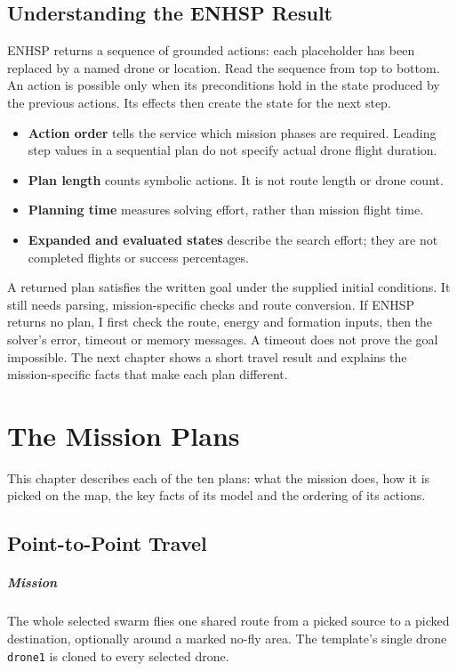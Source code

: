 \documentclass[11pt,a4paper,oneside]{report}
\newcommand{\code}[1]{\texttt{#1}}
\begin{document}
\section{Understanding the ENHSP Result}
ENHSP returns a sequence of grounded actions: each placeholder has been replaced
by a named drone or location. Read the sequence from top to bottom. An action
is possible only when its preconditions hold in the state produced by the
previous actions. Its effects then create the state for the next step.
\begin{itemize}
\item \textbf{Action order} tells the service which mission phases are required.
Leading step values in a sequential plan do not specify actual drone flight duration.
\item \textbf{Plan length} counts symbolic actions. It is not route length or drone count.
\item \textbf{Planning time} measures solving effort, rather than mission flight time.
\item \textbf{Expanded and evaluated states} describe the search effort; they are
not completed flights or success percentages.
\end{itemize}
A returned plan satisfies the written goal under the supplied initial conditions.
It still needs parsing, mission-specific checks and route conversion. If ENHSP
returns no plan, I first check the route, energy and formation inputs, then the
solver's error, timeout or memory messages. A timeout does not prove the goal
impossible. The next chapter shows a short travel result and explains the
mission-specific facts that make each plan different.

\chapter{The Mission Plans}\label{ch:plans}
This chapter describes each of the ten plans: what the mission does, how it is picked on the map,
the key facts of its model and the ordering of its actions.

\section{Point-to-Point Travel}
\paragraph{Mission}
The whole selected swarm flies one shared route from a picked source to a picked destination,
optionally around a marked no-fly area. The template's single drone \code{drone1} is cloned to
every selected drone.
\end{document}
